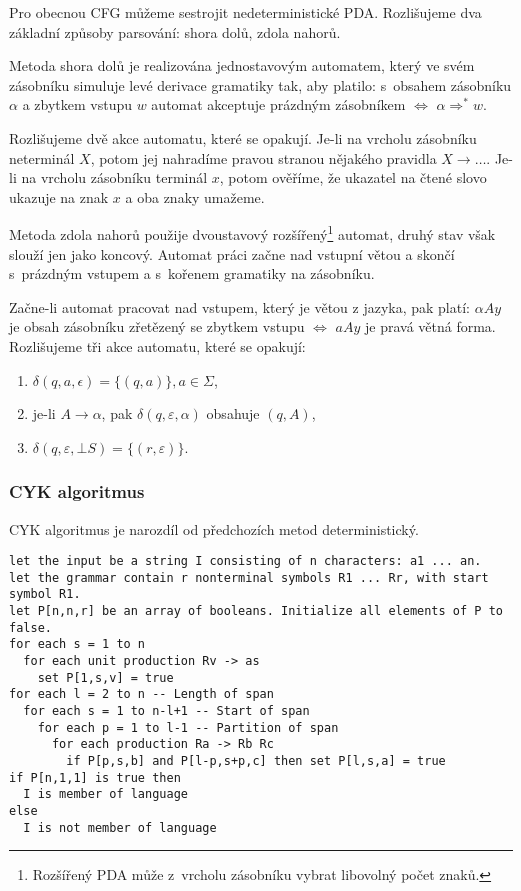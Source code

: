 Pro obecnou CFG můžeme sestrojit nedeterministické PDA. Rozlišujeme dva
základní způsoby parsování: shora dolů, zdola nahorů.

Metoda shora dolů je realizována jednostavovým automatem, který ve svém
zásobníku simuluje levé derivace gramatiky tak, aby platilo:
s~obsahem zásobníku $\alpha$ a zbytkem vstupu $w$ automat akceptuje
prázdným zásobníkem $\iff$ $\alpha \Rightarrow^* w$.

Rozlišujeme dvě akce automatu, které se opakují.
Je-li na vrcholu zásobníku neterminál
$X$, potom jej nahradíme pravou stranou nějakého pravidla $X \to
\ldots$. Je-li na vrcholu zásobníku terminál $x$, potom ověříme,
že ukazatel na čtené slovo ukazuje na znak $x$ a oba znaky umažeme.

\begin{example}

\end{example}

Metoda zdola nahorů použije dvoustavový rozšířený\footnote{Rozšířený
PDA může z~vrcholu zásobníku vybrat libovolný počet znaků.} automat, druhý
stav však slouží jen jako koncový. Automat práci začne
nad vstupní větou a skončí s~prázdným vstupem a s~kořenem gramatiky na
zásobníku.

Začne-li automat pracovat nad vstupem, který je větou z jazyka, pak
platí: $\alpha A y$ je obsah zásobníku zřetězený se zbytkem vstupu
$\iff$ $a A y$ je pravá větná forma. Rozlišujeme tři akce automatu,
které se opakují:
\begin{enumerate}
    \item $\delta(q, a, \epsilon) = \{ (q, a) \}, a \in \Sigma$,
    \item je-li $A \to \alpha$, pak $\delta(q, \varepsilon, \alpha)$
        obsahuje $(q, A)$,
    \item $\delta(q, \varepsilon, \bot S) = \{ (r, \varepsilon) \}$.
\end{enumerate}

\begin{example}
\end{example}


\subsubsection{CYK algoritmus}

CYK algoritmus je narozdíl od předchozích metod deterministický.

\begin{Verbatim}[fontsize=\small]
let the input be a string I consisting of n characters: a1 ... an.
let the grammar contain r nonterminal symbols R1 ... Rr, with start symbol R1.
let P[n,n,r] be an array of booleans. Initialize all elements of P to false.
for each s = 1 to n
  for each unit production Rv -> as
    set P[1,s,v] = true
for each l = 2 to n -- Length of span
  for each s = 1 to n-l+1 -- Start of span
    for each p = 1 to l-1 -- Partition of span
      for each production Ra -> Rb Rc
        if P[p,s,b] and P[l-p,s+p,c] then set P[l,s,a] = true
if P[n,1,1] is true then
  I is member of language
else
  I is not member of language
\end{Verbatim}

